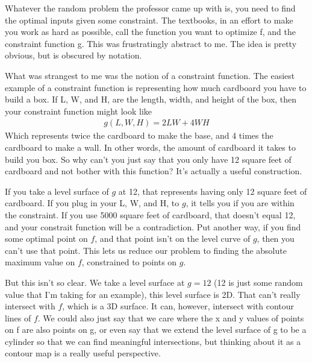 \documentclass[12pt, letterpaper]{article}
\begin{document}
Whatever the random problem the professor came up with is, you need to find the optimal inputs given some constraint.
The textbooks, in an effort to make you work as hard as possible, call the function you want to optimize f, and the constraint function g.
This was frustratingly abstract to me. The idea is pretty obvious, but is obscured by notation.

What was strangest to me was the notion of a constraint function.
The easiest example of a constraint function is representing how much cardboard you have to build a box.
If L, W, and H, are the length, width, and height of the box, then your constraint function might look like
\begin{gather*}
    g(L, W, H) = 2LW + 4WH
\end{gather*}
Which represents twice the cardboard to make the base, and 4 times the cardboard to make a wall.
In other words, the amount of cardboard it takes to build you box.
So why can't you just say that you only have 12 square feet of cardboard and not bother with this function?
It's actually a useful construction.

If you take a level surface of $g$ at 12, that represents having only 12 square feet of cardboard.
If you plug in your L, W, and H, to $g$, it tells you if you are within the constraint.
If you use 5000 square feet of cardboard, that doesn't equal 12, and your constrait function will be a contradiction. 
Put another way, if you find some optimal point on $f$, and that point isn't on the level curve of $g$, then you can't use that point.
This lets us reduce our problem to finding the absolute maximum value on $f$, constrained to points on $g$.

But this isn't so clear. We take a level surface at $g = 12$ (12 is just some random value that I'm taking for an example),
this level surface is 2D. That can't really intersect with $f$, which is a 3D surface.
It can, however, intersect with contour lines of $f$.
We could also just say that we care where the x and y values of points on f are also points on g,
or even say that we extend the level surface of g to be a cylinder so that we can find meaningful intersections,
but thinking about it as a contour map is a really useful perspective. 
\end{document}

